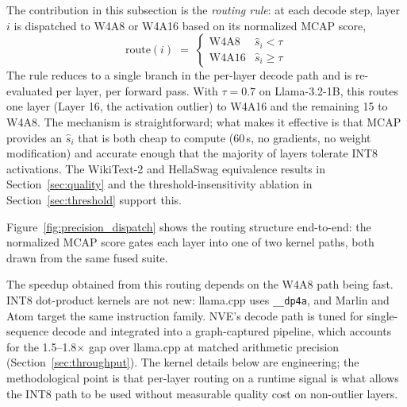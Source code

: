 \documentclass{article}
\begin{document}
The contribution in this subsection is the \emph{routing rule}: at each decode
step, layer $i$ is dispatched to W4A8 or W4A16 based on its normalized MCAP
score,
\[
  \text{route}(i) \;=\; \begin{cases} \text{W4A8} & \hat{s}_i < \tau \\ \text{W4A16} & \hat{s}_i \geq \tau \end{cases}
\]
The rule reduces to a single branch in the per-layer decode path and is
re-evaluated per layer, per forward pass. With $\tau{=}0.7$ on Llama-3.2-1B,
this routes one layer (Layer 16, the activation outlier) to W4A16 and the
remaining 15 to W4A8. The mechanism is straightforward; what makes it
effective is that MCAP provides an $\hat{s}_i$ that is both cheap to compute
(60\,s, no gradients, no weight modification) and accurate enough that the
majority of layers tolerate INT8 activations. The WikiText-2 and HellaSwag
equivalence results in Section~\ref{sec:quality} and the threshold-insensitivity
ablation in Section~\ref{sec:threshold} support this.

Figure~\ref{fig:precision_dispatch} shows the routing structure end-to-end: the
normalized MCAP score gates each layer into one of two kernel paths, both drawn from
the same fused suite.

The speedup obtained from this routing depends on the W4A8 path being fast.
INT8 dot-product kernels are not new: llama.cpp uses \texttt{\_\_dp4a}, and
Marlin and Atom target the same instruction family. NVE's decode path is
tuned for single-sequence decode and integrated into a graph-captured
pipeline, which accounts for the 1.5--1.8$\times$ gap over llama.cpp at
matched arithmetic precision (Section~\ref{sec:throughput}). The kernel
details below are engineering; the methodological point is that per-layer
routing on a runtime signal is what allows the INT8 path to be used without
measurable quality cost on non-outlier layers.
\end{document}
